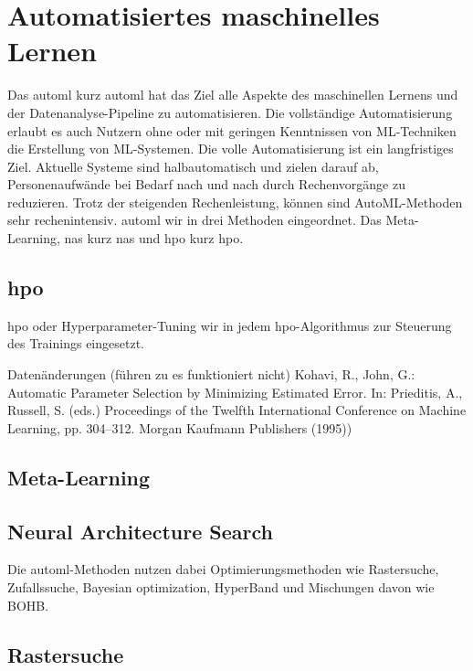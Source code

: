 		\cite{Thung.2018} \cite{Pan.2010}

	\section{Automatisiertes maschinelles Lernen}
	\label{sec:AutoML}
	 Das \acl{automl} kurz \ac{automl} hat das Ziel alle Aspekte des maschinellen Lernens und der Datenanalyse-Pipeline zu automatisieren. Die vollständige Automatisierung erlaubt es auch Nutzern ohne oder mit geringen Kenntnissen von ML-Techniken die Erstellung von ML-Systemen. 
	Die volle Automatisierung ist ein langfristiges Ziel. Aktuelle Systeme sind halbautomatisch und zielen darauf ab, Personenaufwände bei Bedarf nach und nach durch Rechenvorgänge zu reduzieren. Trotz der steigenden Rechenleistung, können sind AutoML-Methoden sehr rechenintensiv.  \ac{automl} wir in drei Methoden eingeordnet. Das Meta-Learning, \acl{nas} kurz \ac{nas} und \acl{hpo} kurz \ac{hpo}. \cite{Hutter.2019} 
	
	\subsection{\acl{hpo}}	
	\acl{hpo} oder Hyperparameter-Tuning wir in jedem \ac{hpo}-Algorithmus zur Steuerung des Trainings eingesetzt. 
	
	\cite{Kohavi.}
	
	\cite{Feurer.2019}		
	
		Datenänderungen (führen zu es funktioniert nicht)
	Kohavi, R., John, G.: Automatic Parameter Selection by Minimizing Estimated Error. In:
	Prieditis, A., Russell, S. (eds.) Proceedings of the Twelfth International Conference on
	Machine Learning, pp. 304–312. Morgan Kaufmann Publishers (1995))
	
	\subsection{Meta-Learning}
		\cite{JoaquinVanschoren.2018}
		\cite{Vanschoren.2019}
	\subsection{Neural Architecture Search}
	\cite{Elsken.2019}	

	Die \ac{automl}-Methoden nutzen dabei Optimierungsmethoden wie Rastersuche, Zufallssuche, Bayesian optimization, HyperBand und Mischungen davon wie BOHB. 

	\subsection{Rastersuche}
			\cite{Michelucci.2018}

